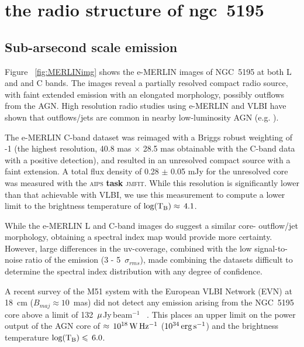 \documentclass[fleqn,usenatbib]{mnras}
\def\Fig{Figure}
\def\mujybm   {${\rm \mu}$Jy\,beam$^{-1}$}
\begin{document}
\section{the radio structure of ngc~5195}

\subsection{Sub-arsecond scale emission}

\Fig~ \ref{fig:MERLINimg} shows the e-MERLIN images of NGC~5195 at both L and  and C bands. The 
images reveal a partially resolved compact radio source, with faint extended emission with an 
elongated morphology, possibly outflows from the AGN. High resolution radio studies using 
e-MERLIN and VLBI have shown that outflows/jets are common in nearby low-luminosity AGN (e.g. 
\citealt{Krips+2007,GP09}). 

The e-MERLIN C-band dataset was reimaged with a Briggs robust weighting of -1 (the highest 
resolution, 40.8 mas $\times$ 28.5 mas obtainable with the C-band data with a positive 
detection), and resulted in an unresolved compact source with a faint extension. A total flux 
density of 0.28 $\pm$ 0.05 mJy for the unresolved core was measured with the \textsc{aips} \textbf{task} \textsc{jmfit}. While this resolution  is significantly  lower than that 
achievable with VLBI, we use this measurement to compute a lower limit to the brightness temperature of ${\rm log(T_{B})}\approx\,4.1$.

While the e-MERLIN L and C-band images do suggest a similar core-
outflow/jet morphology, obtaining a spectral index map would provide more certainty. However, 
large differences in the uv-coverage, combined with the low signal-to-noise ratio of the 
emission (3 - 5~$\sigma_{rms}$), made combining the datasets difficult to determine the 
spectral index distribution with any degree of confidence. 

A recent survey of the M51 system with the European 
VLBI Network (EVN) at 18~cm ($B_{maj} \approx 10$~mas) did not detect any emission arising from 
the NGC~5195 core above a limit of 132~\mujybm~ \citep{Rampadarathetal15}. This places an upper 
limit on the power output of the AGN core of $\approx\,10^{18}\,{\rm W\,Hz^{-1}}$ 
($10^{34}\,{\rm erg\,s^{-1}}$) and the brightness temperature ${\rm log(T_{B})}\leq\,6.0$. 
\end{document}
